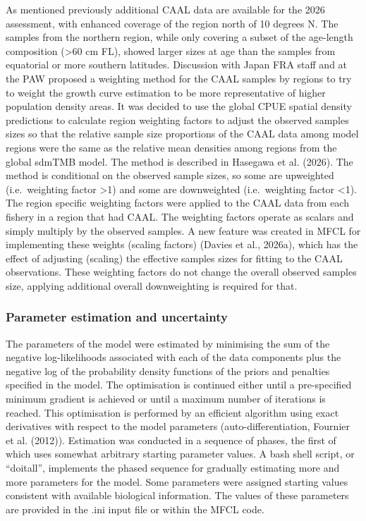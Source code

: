 \documentclass[
  english,
  a4paper,
  a4paper,
  11pt]{SCreport}
\begin{document}
As mentioned previously additional CAAL data are available for the 2026
assessment, with enhanced coverage of the region north of 10 degrees N.
The samples from the northern region, while only covering a subset of
the age-length composition (\textgreater60 cm FL), showed larger sizes
at age than the samples from equatorial or more southern latitudes.
Discussion with Japan FRA staff and at the PAW proposed a weighting
method for the CAAL samples by regions to try to weight the growth curve
estimation to be more representative of higher population density areas.
It was decided to use the global CPUE spatial density predictions to
calculate region weighting factors to adjust the observed samples sizes
so that the relative sample size proportions of the CAAL data among
model regions were the same as the relative mean densities among regions
from the global sdmTMB model. The method is described in Hasegawa et al.
(2026). The method is conditional on the observed sample sizes, so some
are upweighted (i.e.~weighting factor \textgreater1) and some are
downweighted (i.e.~weighting factor \textless1). The region specific
weighting factors were applied to the CAAL data from each fishery in a
region that had CAAL. The weighting factors operate as scalars and
simply multiply by the observed samples. A new feature was created in
MFCL for implementing these weights (scaling factors) (Davies et al.,
2026a), which has the effect of adjusting (scaling) the effective
samples sizes for fitting to the CAAL observations. These weighting
factors do not change the overall observed samples size, applying
additional overall downweighting is required for that.

\subsubsection{Parameter estimation and
uncertainty}\label{sec-parameter-uncertainty}

The parameters of the model were estimated by minimising the sum of the
negative log-likelihoods associated with each of the data components
plus the negative log of the probability density functions of the priors
and penalties specified in the model. The optimisation is continued
either until a pre-specified minimum gradient is achieved or until a
maximum number of iterations is reached. This optimisation is performed
by an efficient algorithm using exact derivatives with respect to the
model parameters (auto-differentiation, Fournier et al. (2012)).
Estimation was conducted in a sequence of phases, the first of which
uses somewhat arbitrary starting parameter values. A bash shell script,
or ``doitall'', implements the phased sequence for gradually estimating
more and more parameters for the model. Some parameters were assigned
starting values consistent with available biological information. The
values of these parameters are provided in the .ini input file or within
the MFCL code.
\end{document}
